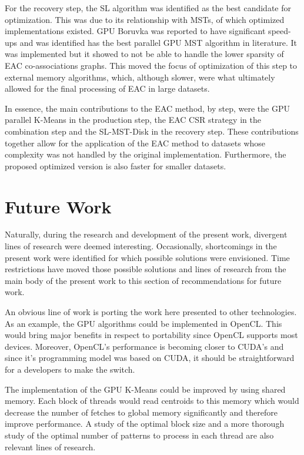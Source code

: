 For the recovery step, the SL algorithm was identified as the best candidate for optimization.
This was due to its relationship with MSTs, of which optimized implementations existed.
GPU Boruvka was reported to have significant speed-ups and was identified has the best parallel GPU MST algorithm in literature.
It was implemented but it showed to not be able to handle the lower sparsity of EAC co-associations graphs.
This moved the focus of optimization of this step to external memory algorithms, which, although slower, were what ultimately allowed for the final processing of EAC in large datasets.

In essence, the main contributions to the EAC method, by step, were the GPU parallel K-Means in the production step, the EAC CSR strategy in the combination step and the SL-MST-Disk in the recovery step.
These contributions together allow for the application of the EAC method to datasets whose complexity was not handled by the original implementation.
Furthermore, the proposed optimized version is also faster for smaller datasets.


\section{Future Work}
\label{section:future}

Naturally, during the research and development of the present work, divergent lines of research were deemed interesting.
Occasionally, shortcomings in the present work were identified for which possible solutions were envisioned.
Time restrictions have moved those possible solutions and lines of research from the main body of the present work to this section of recommendations for future work.

An obvious line of work is porting the work here presented to other technologies.
As an example, the GPU algorithms could be implemented in OpenCL.
This would bring major benefits in respect to portability since OpenCL supports most devices.
Moreover, OpenCL's performance is becoming closer to CUDA's and since it's programming model was based on CUDA, it should be straightforward for a developers to make the switch.

The implementation of the GPU K-Means could be improved by using shared memory.
Each block of threads would read centroids to this memory which would decrease the number of fetches to global memory significantly and therefore improve performance.
A study of the optimal block size and a more thorough study of the optimal number of patterns to process in each thread are also relevant lines of research.

